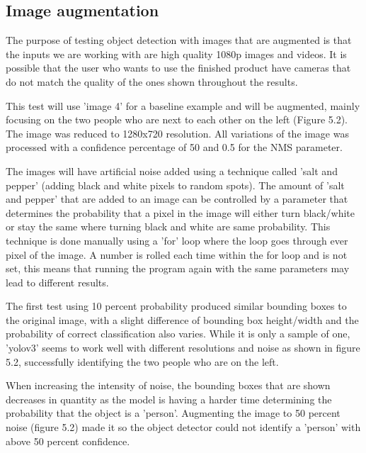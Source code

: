 \documentclass[12pt]{report}
\begin{document}
\subsection{Image augmentation}

The purpose of testing object detection with images that are augmented is that the inputs we are working with are high quality 1080p images and videos. It is possible that the user who wants to use the finished product have cameras that do not match the quality of the ones shown throughout the results.

\vspace{2mm}

This test will use 'image 4' for a baseline example and will be augmented, mainly focusing on the two people who are next to each other on the left (Figure 5.2). The image was reduced to 1280x720 resolution. All variations of the image was processed with a confidence percentage of 50 and 0.5 for the NMS parameter. 

\vspace{2mm}

The images will have artificial noise added using a technique called 'salt and pepper' (adding black and white pixels to random spots). The amount of 'salt and pepper' that are added to an image can be controlled by a parameter that determines the probability that a pixel in the image will either turn black/white or stay the same where turning black and white are same probability. This technique is done manually using a 'for' loop where the loop goes through ever pixel of the image. A number is rolled each time within the for loop and is not set, this means that running the program again with the same parameters may lead to different results.

\vspace{2mm}

The first test using 10 percent probability produced similar bounding boxes to the original image, with a slight difference of bounding box height/width and the probability of correct classification also varies. While it is only a sample of one, 'yolov3' seems to work well with different resolutions and noise as shown in figure 5.2, successfully identifying the two people who are on the left.

\vspace{2mm}

When increasing the intensity of noise, the bounding boxes that are shown decreases in quantity as the model is having a harder time determining the probability that the object is a 'person'. Augmenting the image to 50 percent noise (figure 5.2) made it so the object detector could not identify a 'person' with above 50 percent confidence. 
\end{document}
